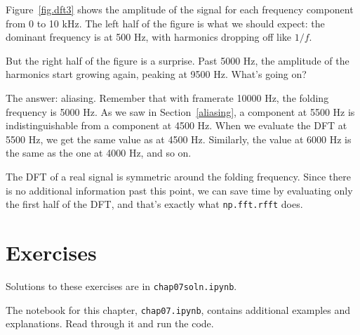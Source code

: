 \documentclass[12pt]{book} \usepackage[width=5.5in,height=8.5in, hmarginratio=3:2,vmarginratio=1:1]{geometry}
\begin{document}
Figure~\ref{fig.dft3} shows the amplitude of the signal for each frequency component from 0 to 10 kHz. The left half of the figure is what we should expect: the dominant frequency is at 500 Hz, with harmonics dropping off like $1/f$. 

But the right half of the figure is a surprise. Past 5000 Hz, the amplitude of the harmonics start growing again, peaking at 9500 Hz. What's going on? 

The answer: aliasing. Remember that with framerate 10000 Hz, the folding frequency is 5000 Hz. As we saw in Section~\ref{aliasing}, a component at 5500 Hz is indistinguishable from a component at 4500 Hz. When we evaluate the DFT at 5500 Hz, we get the same value as at 4500 Hz. Similarly, the value at 6000 Hz is the same as the one at 4000 Hz, and so on. 

The DFT of a real signal is symmetric around the folding frequency. Since there is no additional information past this point, we can save time by evaluating only the first half of the DFT, and that's exactly what {\tt np.fft.rfft} does. 

\section{Exercises} 

Solutions to these exercises are in {\tt chap07soln.ipynb}. 

\begin{exercise} The notebook for this chapter, {\tt chap07.ipynb}, contains additional examples and explanations. Read through it and run the code. \end{exercise} 
\end{document}

